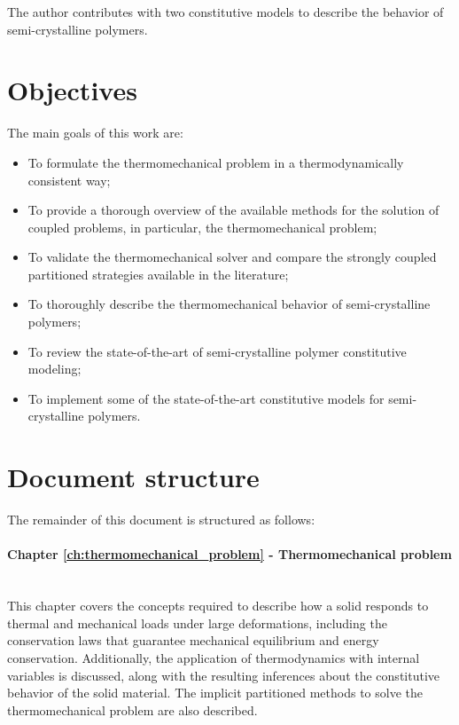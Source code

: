 The author contributes with two constitutive models to describe the behavior of semi-crystalline polymers.

\section{Objectives}

The main goals of this work are:
\begin{itemize}
    \item To formulate the thermomechanical problem in a thermodynamically consistent way;
    \item To provide a thorough overview of the available methods for the solution of coupled problems, in particular, the thermomechanical problem;
    \item To validate the thermomechanical solver and compare the strongly coupled partitioned strategies available in the literature;
    \item To thoroughly describe the thermomechanical behavior of semi-crystalline polymers;
    \item To review the state-of-the-art of semi-crystalline polymer constitutive modeling;
    \item To implement some of the state-of-the-art constitutive models for semi-crystalline polymers.
\end{itemize}

\section{Document structure}

The remainder of this document is structured as follows:

\paragraph{Chapter \ref{ch:thermomechanical_problem} - Thermomechanical problem}\mbox{}\\
This chapter covers the concepts required to describe how a solid responds to thermal and mechanical loads under large deformations, including the conservation laws that guarantee mechanical equilibrium and energy conservation.
Additionally, the application of thermodynamics with internal variables is discussed, along with the resulting inferences about the constitutive behavior of the solid material.
The implicit partitioned methods to solve the thermomechanical problem are also described.

